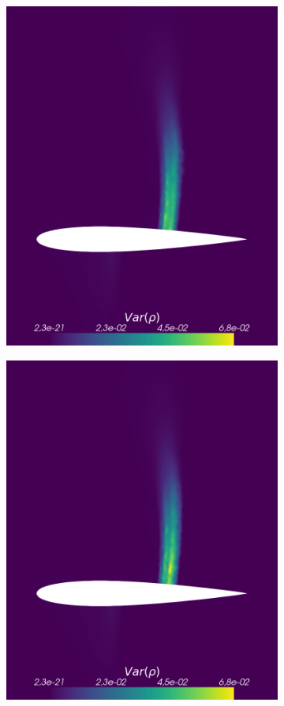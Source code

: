 \begin{figure}[h!]
\begin{subfigure}{0.3\linewidth}
		\includegraphics[scale=0.2]{figs/Euler1DPlots5/sg_4_9_VarRho.png}
		\label{fig:sub2}
	\end{subfigure}%
	\hfill
	\begin{subfigure}{0.3\linewidth}
		\centering
		\includegraphics[scale=0.2]{figs/Euler1DPlots5/osIPM4-4_VarRho.png}

\end{subfigure}
\end{figure}
